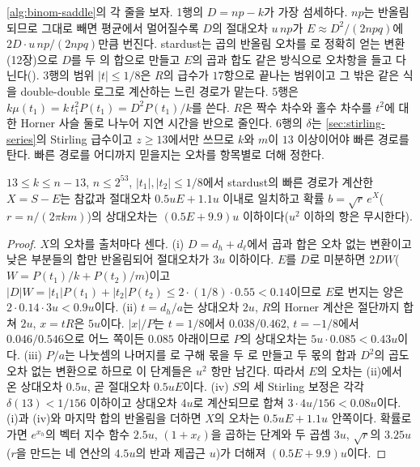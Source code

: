 \cref{alg:binom-saddle}의 각 줄을 보자. 1행의 $D=np-k$가 가장 섬세하다. $np$는 반올림되므로 그대로 빼면 평균에서 멀어질수록 $D$의 절대오차 $u\,np$가 $E\approx D^2/(2npq)$에 $2D\cdot u\,np/(2npq)$만큼 번진다. stardust는 곱의 반올림 오차를 로 정확히 얻는 변환(12장)으로 $D$를 두 의 합으로 만들고 $E$의 곱과 합도 같은 방식으로 오차항을 들고 다닌다(). 3행의 범위 $|t|\le1/8$은 $R$의 급수가 $17$항으로 끝나는 범위이고 그 밖은 같은 식을 double-double 로그로 계산하는 느린 경로가 맡는다. 5행은 $k\mu(t_1)=k\,t_1^2P(t_1)=D^2P(t_1)/k$를 쓴다. $R$은 짝수 차수와 홀수 차수를 $t^2$에 대한 Horner 사슬 둘로 나누어 지연 시간을 반으로 줄인다. 6행의 $\delta$는 \cref{sec:stirling-series}의 Stirling 급수이고 $z\ge13$에서만 쓰므로 $k$와 $m$이 $13$ 이상이어야 빠른 경로를 탄다. 빠른 경로를 어디까지 믿을지는 오차를 항목별로 더해 정한다.

\begin{proposition}
\label{prop:saddle-budget}
$13\le k\le n-13$, $n\le2^{53}$, $|t_1|,|t_2|\le1/8$에서 stardust의 빠른 경로가 계산한 $X=S-E$는 참값과 절대오차 $0.5uE+1.1u$ 이내로 일치하고 확률 $b=\sqrt{r}\,e^X$($r=n/(2\pi km)$)의 상대오차는 $(0.5E+9.9)u$ 이하이다($u^2$ 이하의 항은 무시한다).
\end{proposition}

\begin{proof}
$X$의 오차를 출처마다 센다. (i) $D=d_h+d_\ell$에서 곱과 합은 오차 없는 변환이고 낮은 부분들의 합만 반올림되어 절대오차가 $3u$ 이하이다. $E$를 $D$로 미분하면 $2DW$($W=P(t_1)/k+P(t_2)/m$)이고 $|D|W=|t_1|P(t_1)+|t_2|P(t_2)\le2\cdot(1/8)\cdot0.55<0.14$이므로 $E$로 번지는 양은 $2\cdot0.14\cdot3u<0.9u$이다. (ii) $t=d_h/a$는 상대오차 $2u$, $R$의 Horner 계산은 절단까지 합쳐 $2u$, $x=tR$은 $5u$이다. $|x|/P$는 $t=1/8$에서 $0.038/0.462$, $t=-1/8$에서 $0.046/0.546$으로 어느 쪽이든 $0.085$ 아래이므로 $P$의 상대오차는 $5u\cdot0.085<0.43u$이다. (iii) $P/a$는 나눗셈의 나머지를 로 구해 몫을 두 로 만들고 두 몫의 합과 $D^2$의 곱도 오차 없는 변환으로 하므로 이 단계들은 $u^2$ 항만 남긴다. 따라서 $E$의 오차는 (ii)에서 온 상대오차 $0.5u$, 곧 절대오차 $0.5uE$이다. (iv) $S$의 세 Stirling 보정은 각각 $\delta(13)<1/156$ 이하이고 상대오차 $4u$로 계산되므로 합쳐 $3\cdot4u/156<0.08u$이다. (i)과 (iv)와 마지막 합의 반올림을 더하면 $X$의 오차는 $0.5uE+1.1u$ 안쪽이다. 확률로 가면 $e^{x_h}$의 벡터 지수 함수 $2.5u$, $(1+x_\ell)$을 곱하는 단계와 두 곱셈 $3u$, $\sqrt r$의 $3.25u$($r$을 만드는 네 연산의 $4.5u$의 반과 제곱근 $u$)가 더해져 $(0.5E+9.9)u$이다.
\end{proof}

